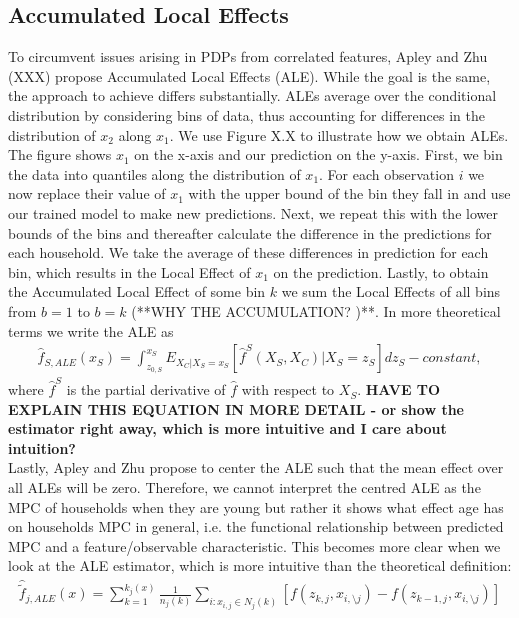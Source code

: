 \subsection{Accumulated Local Effects}
To circumvent issues arising in PDPs from correlated features, Apley and Zhu (XXX) propose Accumulated Local Effects (ALE). While the goal is the same, the approach to achieve differs substantially. ALEs average over the conditional distribution by considering bins of data, thus accounting for differences in the distribution of $x_2$ along $x_1$. We use Figure X.X to illustrate how we obtain ALEs. The figure shows $x_1$ on the x-axis and our prediction on the y-axis. First, we bin the data into quantiles along the distribution of $x_1$. For each observation $i$ we now replace their value of $x_1$ with the upper bound of the bin they fall in and use our trained model to make new predictions. Next, we repeat this with the lower bounds of the bins and thereafter calculate the difference in the predictions for each household. We take the average of these differences in prediction for each bin, which results in the Local Effect of $x_1$  on the prediction. Lastly, to obtain the Accumulated Local Effect of some bin $k$ we sum the Local Effects of all bins from $b=1$ to $b=k$ (**WHY THE ACCUMULATION? )**. In more theoretical terms we write the ALE as 
\begin{align}
    \hat{f}_{S, ALE} (x_S)=\int_{z_{0, S}}^{x_S} E_{X_C|X_S=x_S}[\hat{f}^S(X_S, X_C)|X_S=z_S]dz_S - constant, \label{eq:ale}
\end{align}
where $\hat{f}^S$ is the partial derivative of $\hat{f}$ with respect to $X_S$. \textbf{HAVE TO EXPLAIN THIS EQUATION IN MORE DETAIL - or show the estimator right away, which is more intuitive and I care about intuition?} \\
Lastly, Apley and Zhu propose to center the ALE such that the mean effect over all ALEs will be zero. Therefore, we cannot interpret the centred ALE as the MPC of households when they are young but rather it shows what effect age has on households MPC in general, i.e. the functional relationship between predicted MPC and a feature/observable characteristic. This becomes more clear when we look at the ALE estimator, which is more intuitive than the theoretical definition: 
\begin{align}
    \hat{\tilde{f}}_{j, ALE}(x)=\sum_{k=1}^{k_j(x)} \frac{1}{n_j(k)}\sum_{i:x_{i,j}\in N_j(k)}[f(z_{k,j}, x_{i,\setminus j})-f(z_{k-1,j}, x_{i,\setminus j})] \label{eq:ale_estim}
\end{align}
